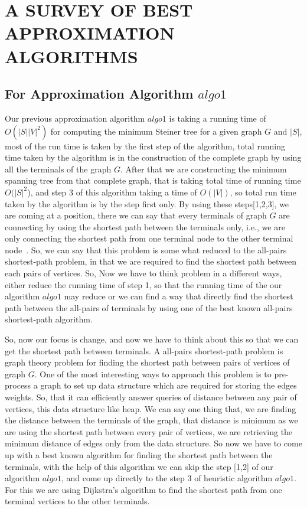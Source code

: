 \chapter{A SURVEY OF BEST APPROXIMATION ALGORITHMS} \label{ch_review}
\section{For Approximation Algorithm $algo1$}
Our previous approximation algorithm $algo1$ is taking a running time of $O(|S||V|^2)$ for computing the minimum Steiner tree for a given graph $G$ and $|S|$, most of the run time is taken by the first step of the algorithm, total running time taken by the algorithm is in the construction of the complete graph by using all the terminals of the graph $G$. After that we are constructing the minimum spanning tree from that complete graph, that is taking total time of running time $O(|S|^2$), and step 3 of this algorithm taking a time of $O(|V|)$, so total run time taken by the algorithm is by the step first only. By using these steps[1,2,3], we are coming at a position, there we can say that every terminals of graph $G$ are connecting by using the shortest path between the terminals only, i.e., we are only connecting the shortest path from one terminal node to the other terminal node~\cite{markowsky}.
  So, we can say that this problem is some what reduced to the all-pairs shortest-path problem, in that we are required to find the shortest path between each pairs of vertices. So, Now we have to think problem in a different ways, either reduce the running time of step 1, so that the running time of the our algorithm $algo1$ may reduce or we can find a way that directly find the shortest path between the all-pairs of terminals by using one of the best known all-pairs shortest-path algorithm.

  So, now our focus is change, and now we have to think about this so that we can get the shortest path between terminals. 
  A all-pairs shortest-path problem is graph theory problem for finding the shortest path between pairs of vertices of graph $G$.
 One of the most interesting ways to approach this problem is to pre-process a graph to set up data structure which are required for storing the edges weights. So, that it can efficiently answer queries of distance between any pair of vertices, this data structure like heap. We can say one thing that, we are finding the distance between the terminals of the graph, that distance is minimum as we are using the shortest path between every pair of vertices, we are retrieving the minimum distance of edges only from the data structure. So now we have to come up with a best known algorithm for finding the shortest path between the terminals, with the help of this algorithm we can skip the step [1,2] of our algorithm $algo1$, and come up directly to the step 3 of heuristic algorithm $algo1$. For this we are using Dijkstra's algorithm to find the shortest path from one terminal vertices to the other terminals.
